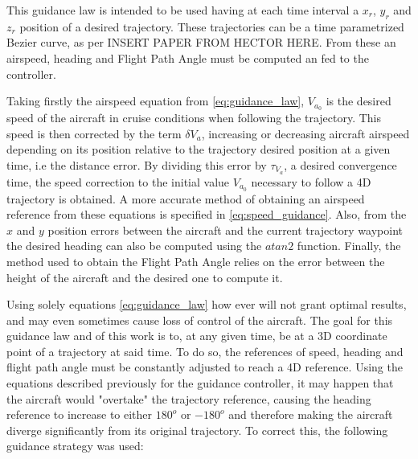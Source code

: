 This guidance law is intended to be used having at each time interval a $x_r$, $y_r$ and $z_r$ position of a desired trajectory. These trajectories can be a time parametrized Bezier curve, as per INSERT PAPER FROM HECTOR HERE. From these an airspeed, heading and Flight Path Angle must be computed an fed to the controller. 

Taking firstly the airspeed equation from \ref{eq:guidance_law}, $V_{a_0}$ is the desired speed of the aircraft in cruise conditions when following the trajectory. This speed is then corrected by the term $\delta V_a$, increasing or decreasing aircraft airspeed depending on its position relative to the trajectory desired position at a given time, i.e the distance error. By dividing this error by $\tau_{V_a}$, a desired convergence time, the speed correction to the initial value $V_{a_0}$ necessary to follow a 4D trajectory is obtained. A more accurate method of obtaining an airspeed reference from these equations is specified in \ref{eq:speed_guidance}. Also, from the $x$ and $y$ position errors between the aircraft and the current trajectory waypoint the desired heading can also be computed using the $atan2$ function. Finally, the method used to obtain the Flight Path Angle relies on the error between the height of the aircraft and the desired one to compute it. 



Using solely equations \ref{eq:guidance_law} how ever will not grant optimal results, and may even sometimes cause loss of control of the aircraft. The goal for this guidance law and of this work is to, at any given time, be at a 3D coordinate point of a trajectory at said time. To do so, the references of speed, heading and flight path angle must be constantly adjusted to reach a 4D reference. Using the equations described previously for the guidance controller, it may happen that the aircraft would "overtake" the trajectory reference, causing the heading reference to increase to either $180^o$ or $-180^o$ and therefore making the aircraft diverge significantly from its original trajectory. To correct this, the following guidance strategy was used:

